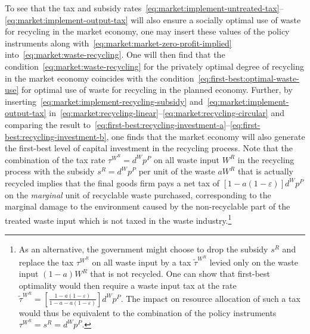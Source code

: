 To see that the tax and subsidy rates~\eqref{eq:market:implement-untreated-tax}--\eqref{eq:market:implement-output-tax} will also ensure a socially optimal use of waste for recycling in the market economy, one may insert these values of the policy instruments along with~\eqref{eq:market:market-zero-profit-implied} into~\eqref{eq:market:waste-recycling}. One will then find that the condition~\eqref{eq:market:waste-recycling} for the privately optimal degree of recycling in the market economy coincides with the condition~\eqref{eq:first-best:optimal-waste-use} for optimal use of waste for recycling in the planned economy. Further, by inserting~\eqref{eq:market:implement-recycling-subsidy} and~\eqref{eq:market:implement-output-tax} in~\eqref{eq:market:recycling-linear}--\eqref{eq:market:recycling-circular} and comparing the result to~\eqref{eq:first-best:recycling-investment-a}--\eqref{eq:first-best:recycling-investment-b}, one finds that the market economy will also generate the first-best level of capital investment in the recycling process. Note that the combination of the tax rate $\tau^{W^R} = d^W p^P$ on all waste input $W^R$ in the recycling process with the subsidy $s^R = d^W p^P$ per unit of the waste $aW^R$ that is actually recycled implies that the final goods firm pays a net tax of $\left[1-a(1-\varepsilon)\right]d^W p^P$ on the \emph{marginal} unit of recyclable waste purchased, corresponding to the marginal damage to the environment caused by the non-recyclable part of the treated waste input which is not taxed in the waste industry.\footnote{As an alternative, the government might choose to drop the subsidy $s^R$ and replace the tax $\tau^{W^R}$ on all waste input by a tax $\widetilde\tau^{W^R}$ levied only on the waste input $(1-a)W^R$ that is not recycled. One can show that first-best optimality would then require a waste input tax at the rate $\widetilde\tau^{W^R} = \left[\frac{1-a(1-\varepsilon)}{1-a-a(1-\varepsilon)}\right] d^W p^P$. The impact on resource allocation of such a tax would thus be equivalent to the combination of the policy instruments $\tau^{W^R} = s^R = d^W p^P$.}

